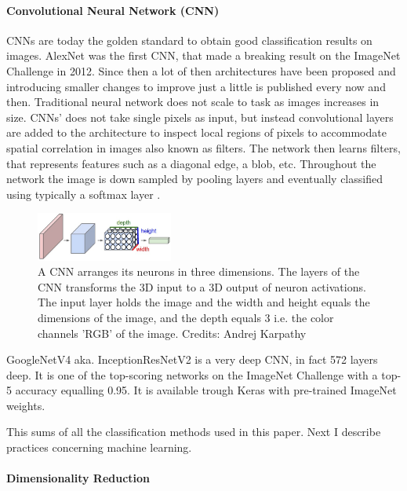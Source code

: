 \paragraph{Convolutional Neural Network (CNN)}

CNNs are today the golden standard to obtain good classification results on images. AlexNet was the first CNN, that made a breaking result on the ImageNet Challenge in 2012. Since then a lot of then architectures have been proposed and introducing smaller changes to improve just a little is published every now and then. Traditional neural network does not scale to task as images increases in size. CNNs' does not take single pixels as input, but instead convolutional layers are added to the architecture to inspect local regions of pixels to accommodate spatial correlation in images also known as filters. The network then learns filters, that represents features such as a diagonal edge, a blob, etc. Throughout the network the image is down sampled by pooling layers and eventually classified using typically a softmax layer \cite{karpathy-convnet}. 

\begin{figure}[H]
    \centering
    \includegraphics[width=0.4\textwidth]{figures/cnn.jpeg}
    \caption[]{A CNN arranges its neurons in three dimensions. The layers of the CNN transforms the 3D input to a 3D output of neuron activations. The input layer holds the image and the width and height equals the dimensions of the image, and the depth equals 3 i.e. the color channels 'RGB' of the image. Credits: Andrej Karpathy}
    \label{fig:cnn}
\end{figure}

GoogleNetV4 aka. InceptionResNetV2 \cite{SzegedyIV16} is a very deep CNN, in fact 572 layers deep. It is one of the top-scoring networks on the ImageNet Challenge with a top-5 accuracy equalling 0.95. \cite{chollet} It is available trough Keras with pre-trained ImageNet weights. 

This sums of all the classification methods used in this paper. Next I describe practices concerning machine learning.

\paragraph{Dimensionality Reduction}

